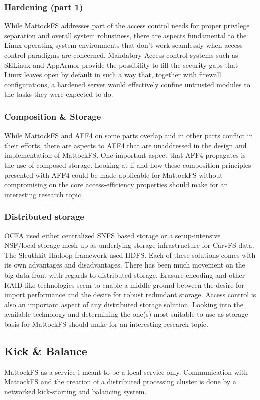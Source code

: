 \subsubsection{Hardening (part 1)}
While MattockFS addresses part of the access control needs for proper privilege separation and overall system robustness, there are aspects fundamental to the Linux operating system environments that don't work seamlessly when access control paradigms are concerned. Mandatory Access control systems such as SELinux and AppArmor provide the possibility to fill the security gaps that Linux leaves open by default in such a way that, together with firewall configurations, a hardened server would effectively confine untrusted modules to the tasks they were expected to do.
\subsubsection{Composition \& Storage}
While MattockFS and AFF4 on some parts overlap and in other parts conflict in their efforts, there are aspects to AFF4 that are unaddressed in the design and implementation of MattockFS. One important aspect that AFF4 propagates is the use of composed storage. Looking at if and how these composition principles presented with AFF4 could be made applicable for MattockFS without compromising on the core access-efficiency properties should make for an interesting research topic.
\subsubsection{Distributed storage}
OCFA used either centralized SNFS based storage or a setup-intensive NSF/local-storage mesh-up as underlying storage infrastructure for CarvFS data. The Sleuthkit Hadoop framework used HDFS. Each of these solutions comes with its own advantages and disadvantages. There has been much movement on the big-data front with regards to distributed storage. Erasure encoding and other RAID like technologies seem to enable a middle ground between the desire for import performance and the desire for robust redundant storage. Access control is also an important aspect of any distributed storage solution. Looking into the available technology and determining the one(s) most suitable to use as storage basis for MattockFS should make for an interesting research topic. 
\subsection{Kick \& Balance}
MattockFS as a service i meant to be a local service only. Communication with MattockFS and the creation of a distributed processing cluster is done by a networked kick-starting and balancing system.
